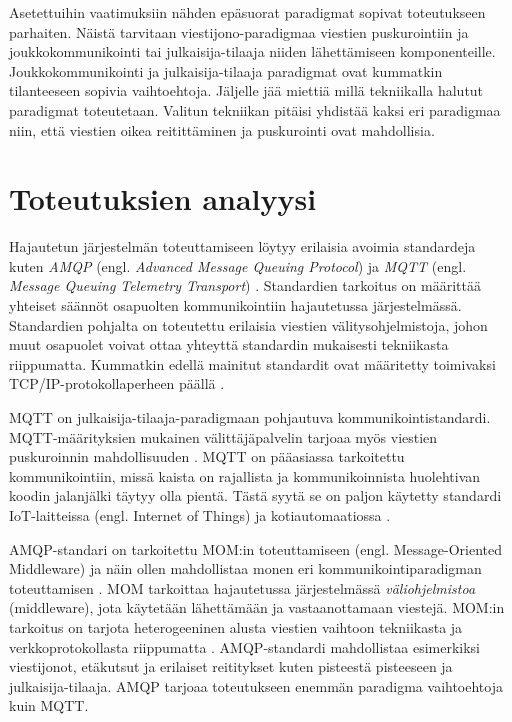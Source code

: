 Asetettuihin vaatimuksiin nähden epäsuorat paradigmat sopivat toteutukseen parhaiten. Näistä tarvitaan viestijono-paradigmaa viestien puskurointiin ja joukkokommunikointi tai julkaisija-tilaaja niiden lähettämiseen komponenteille. Joukkokommunikointi ja julkaisija-tilaaja paradigmat ovat kummatkin tilanteeseen sopivia vaihtoehtoja. Jäljelle jää miettiä millä tekniikalla halutut paradigmat toteutetaan. Valitun tekniikan pitäisi yhdistää kaksi eri paradigmaa niin, että viestien oikea reitittäminen ja puskurointi ovat mahdollisia.



\section{Toteutuksien analyysi}
Hajautetun järjestelmän toteuttamiseen löytyy erilaisia avoimia standardeja kuten \emph{AMQP} (engl. \emph{Advanced Message Queuing Protocol}) \cite{amqp-homepage} ja \emph{MQTT} (engl. \emph{Message Queuing Telemetry Transport}) \cite{mqtt-homepage}. Standardien tarkoitus on määrittää yhteiset säännöt osapuolten kommunikointiin hajautetussa järjestelmässä. Standardien pohjalta on toteutettu erilaisia viestien välitysohjelmistoja, johon muut osapuolet voivat ottaa yhteyttä standardin mukaisesti tekniikasta riippumatta. Kummatkin edellä mainitut standardit ovat määritetty toimivaksi TCP/IP-protokollaperheen päällä \cite[s.~1]{mqtt-specification} \cite[s.~22]{AMQP-specification}.

MQTT on julkaisija-tilaaja-paradigmaan pohjautuva kommunikointistandardi. MQTT\--mää\-ri\-tyk\-si\-en mukainen välittäjäpalvelin tarjoaa myös viestien puskuroinnin mahdollisuuden \cite{mqtt-specification}. MQTT on pääasiassa tarkoitettu kommunikointiin, missä kaista on rajallista ja kommunikoinnista huolehtivan koodin jalanjälki täytyy olla pientä. Tästä syytä se on paljon käytetty standardi IoT-laitteissa (engl. Internet of Things) ja kotiautomaatiossa \cite[s.~9--11]{mqtt-for-iot}.

AMQP-standari on tarkoitettu MOM:in toteuttamiseen (engl. Message-Oriented Middleware) ja näin ollen mahdollistaa monen eri kommunikointiparadigman toteuttamisen \cite[s.~6]{AMQP-specification}. MOM tarkoittaa hajautetussa järjestelmässä \emph{väliohjelmistoa} (middleware), jota käytetään lähettämään ja vastaanottamaan viestejä. MOM:in tarkoitus on tarjota heterogeeninen alusta viestien vaihtoon tekniikasta ja verkkoprotokollasta riippumatta \cite{mom}. AMQP-standardi mahdollistaa esimerkiksi viestijonot, etäkutsut ja erilaiset reititykset kuten pisteestä pisteeseen ja julkaisija-tilaaja. AMQP tarjoaa toteutukseen enemmän paradigma vaihtoehtoja kuin MQTT.

